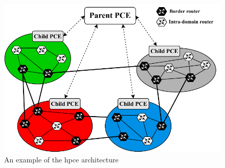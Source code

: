 \setlength{\intextsep}{3pt}
\renewcommand{\scalefigure}{0.8}
\begin{figure}[htbp]
	\centering
	\includegraphics[scale=\scalefigure]{Figures/chap 2/h-PCE.pdf}
	\caption{An example of the \gls{hpce} architecture}
	\label{fig:h-PCE}
\end{figure}
